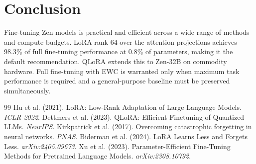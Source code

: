 \documentclass[11pt,a4paper]{article}
\begin{document}
\section{Conclusion}

Fine-tuning Zen models is practical and efficient across a wide range of methods
and compute budgets. LoRA rank 64 over the attention projections achieves
98.3\% of full fine-tuning performance at 0.8\% of parameters, making it the
default recommendation. QLoRA extends this to Zen-32B on commodity hardware.
Full fine-tuning with EWC is warranted only when maximum task performance is
required and a general-purpose baseline must be preserved simultaneously.


\begin{thebibliography}{99}
 Hu et al. (2021). LoRA: Low-Rank Adaptation of Large Language Models. \textit{ICLR 2022}.
 Dettmers et al. (2023). QLoRA: Efficient Finetuning of Quantized LLMs. \textit{NeurIPS}.
 Kirkpatrick et al. (2017). Overcoming catastrophic forgetting in neural networks. \textit{PNAS}.
 Biderman et al. (2024). LoRA Learns Less and Forgets Less. \textit{arXiv:2405.09673}.
 Xu et al. (2023). Parameter-Efficient Fine-Tuning Methods for Pretrained Language Models. \textit{arXiv:2308.10792}.
\end{thebibliography}
\end{document}
